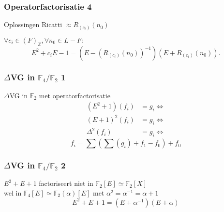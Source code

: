 \documentclass[20pt]{beamer}
\begin{document}
\begin{frame}
    \frametitle{Operatorfactorisatie 4}
    
    Oplossingen Ricatti $\approx R_{(c_i)}(n_0)$ \pause
    \begin{theorem}
        \small{$\forall c_i \in (F)_{\mathbb{Z}},\forall n_0 \in L-F:$
        \vspace*{-0.5cm}
        $$
            E^2 +c_i E -1 = (E - (R_{(c_i)}(n_0))^{-1})(E + R_{(c_i)}(n_0)).
        $$}
    \end{theorem}
\end{frame}




\begin{frame}
    \frametitle{$\Delta$VG in $\mathbb{F}_4/\mathbb{F}_2$ 1}
    $\Delta$VG in $\mathbb{F}_2$ met operatorfactorisatie\\ \pause
    \vspace*{-1cm}
    \begin{align*}
        (E^2+1)(f_i)  & =g_i \Leftrightarrow \\
        (E+1)^2(f_i)  & =g_i \Leftrightarrow \\
        \Delta^2(f_i) & =g_i \Leftrightarrow
    \end{align*}\pause
    \vspace*{-0.5cm}
    $$
        f_i   = \sum{\left(\sum{\left(g_i\right)} + f_1 -f_0\right)} +f_0
    $$
\end{frame}

\begin{frame}
    \frametitle{$\Delta$VG in $\mathbb{F}_4/\mathbb{F}_2$ 2}
    $E^2+E+1$ factoriseert niet in $\mathbb{F}_2[E] \simeq \mathbb{F}_2[X]$ \\ \pause
    wel in $\mathbb{F}_4[E] \simeq \mathbb{F}_2(\alpha)[E]$ met $\alpha^2 = \alpha^{-1}=\alpha +1$ \pause
    $$
        E^2+E+1 = (E + \alpha^{-1})(E+\alpha)
    $$


\end{frame}
\end{document}
